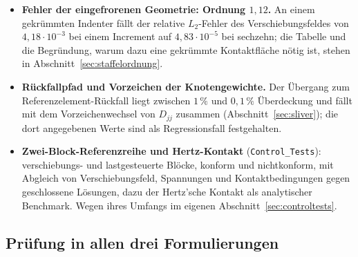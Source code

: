 \documentclass[a4paper,11pt]{article}
\def\bm#1{#1}%
\def\tilde#1{#1}%
\newcommand{\file}[1]{\texttt{\small #1}}
\begin{document}
\begin{itemize}
        Ausgewertet wird zweimal. Mit den \emph{eingefrorenen} Größen $\bm D,\bm M,\bm n_j$ ist
        die Prüfung die Auswertung genau der Gleichungen, die der Löser aufgestellt hat; sie ist
        über alle Lastfälle bis auf Löserrauschen ($<10^{-7}$ relativ) erfüllt. Diese Auswertung
        kann den Staffelungsfehler aus Abschnitt~\ref{sec:frozen} allerdings prinzipiell nicht
        sehen, weil er gerade in diesen Größen steckt. Die zweite Auswertung rechnet
        $\bm D,\bm M,\bm n_j$ deshalb an der \emph{konvergierten} Konfiguration neu und misst den
        physikalisch verbliebenen Spalt. Bei einer Schrittweite von $\Delta t\le0{,}1$ verbleiben
        höchstens $6{,}0\cdot10^{-5}$ der aufgebrachten Verschiebung an Durchdringung, im
        3D-Zweig um mehrere Größenordnungen weniger.
  \item \textbf{Fehler der eingefrorenen Geometrie: Ordnung $1{,}12$.} An einem gekrümmten
        Indenter fällt der relative $L_2$-Fehler des Verschiebungsfeldes von $4{,}18\cdot10^{-3}$
        bei einem Increment auf $4{,}83\cdot10^{-5}$ bei sechzehn; die Tabelle und die Begründung,
        warum dazu eine gekrümmte Kontaktfläche nötig ist, stehen in
        Abschnitt~\ref{sec:staffelordnung}.
  \item \textbf{Rückfallpfad und Vorzeichen der Knotengewichte.} Der Übergang zum
        Referenzelement-Rückfall liegt zwischen $1\,\%$ und $0{,}1\,\%$ Überdeckung und fällt mit
        dem Vorzeichenwechsel von $\tilde D_{jj}$ zusammen (Abschnitt~\ref{sec:sliver}); die dort
        angegebenen Werte sind als Regressionsfall festgehalten.
  \item \textbf{Zwei-Block-Referenzreihe und Hertz-Kontakt}
        (\file{Control\_Tests}): verschiebungs- und lastgesteuerte Blöcke, konform und
        nichtkonform, mit Abgleich von Verschiebungsfeld, Spannungen und Kontaktbedingungen gegen
        geschlossene Lösungen, dazu der Hertz'sche Kontakt als analytischer Benchmark. Wegen ihres
        Umfangs im eigenen Abschnitt~\ref{sec:controltests}.
\end{itemize}


\subsection{Prüfung in allen drei Formulierungen}
\label{sec:verifformulations}
\end{document}
